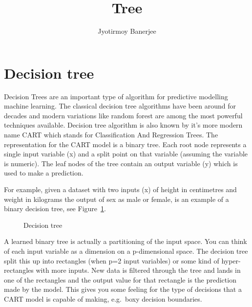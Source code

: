 \documentclass{article}
\title{Tree}
\author{Jyotirmoy Banerjee}
\begin{document}
\maketitle


\section{Decision tree}
Decision Trees are an important type of algorithm for predictive modelling machine learning.
The classical decision tree algorithms have been around for decades and modern variations like random forest are among the most powerful techniques available.
Decision tree algorithm is also known by it's more modern name CART which stands for Classification And Regression Trees. The representation for the CART model is a binary tree. Each root node represents a single input variable (x) and a split point on that variable (assuming the variable is numeric). The leaf nodes of the tree contain an output variable (y) which is used to make a prediction.

For example, given a dataset with two inputs (x) of height in centimetres and weight in kilograms the output of sex as male or female, is an example of a binary decision tree, see Figure~\ref{fig:decisiontree}.
\begin{figure}
\centering
{}
\caption{Decision tree}
\label{fig:decisiontree}
\end{figure}
A learned binary tree is actually a partitioning of the input space. You can think of each input variable as a dimension on a p-dimensional space. The decision tree split this up into rectangles (when p=2 input variables) or some kind of hyper-rectangles with more inputs.
New data is filtered through the tree and lands in one of the rectangles and the output value for that rectangle is the prediction made by the model. This gives you some feeling for the type of decisions that a CART model is capable of making, e.g.\ boxy decision boundaries.
\end{document}

